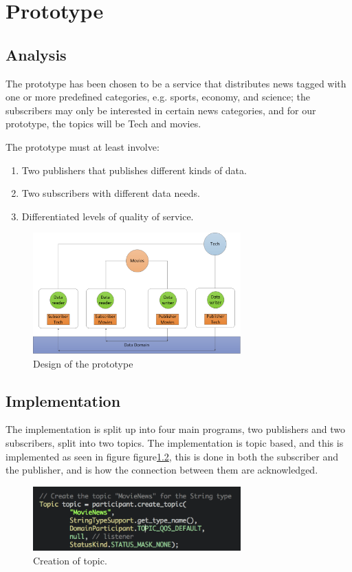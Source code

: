 \chapter{Prototype}
\section{Analysis}
The prototype has been chosen to be a service that distributes news tagged with one or more predefined categories,
e.g. sports, economy, and science; the subscribers may only be interested in certain news
categories, and for our prototype, the topics will be Tech and movies.

The prototype must at least involve:

\begin{enumerate}
  \item Two publishers that publishes different kinds of data.
  \item Two subscribers with different data needs.
  \item Differentiated levels of quality of service.
\end{enumerate}

\begin{figure}[ht!]
\centering
\includegraphics[width=80mm]{img/DDS_Prototype.png}
\caption{Design of the prototype}
\label{DDSPrototype}
\end{figure}

\section{Implementation}
The implementation is split up into four main programs, two publishers and two subscribers, split into two topics. The implementation is topic based, and this is implemented as seen in figure figure\ref{TopicCreation}, this is done in both the subscriber and the publisher, and is how the connection between them are acknowledged.

\begin{figure}[ht!]
\centering
\includegraphics[width=80mm]{img/TopicCreation.png}
\caption{Creation of topic.}
\label{TopicCreation}
\end{figure}

